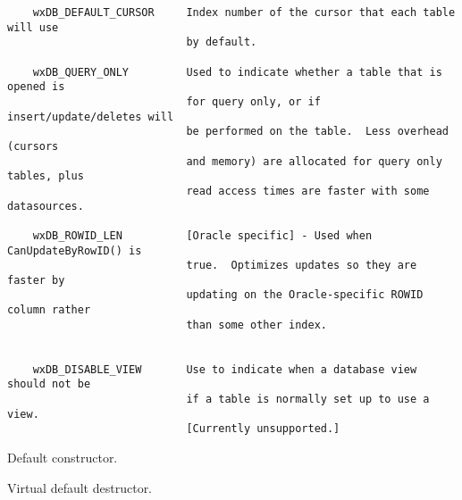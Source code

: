 \begin{verbatim}
    wxDB_DEFAULT_CURSOR     Index number of the cursor that each table will use
                            by default.

    wxDB_QUERY_ONLY         Used to indicate whether a table that is opened is
                            for query only, or if insert/update/deletes will
                            be performed on the table.  Less overhead (cursors
                            and memory) are allocated for query only tables, plus
                            read access times are faster with some datasources.

    wxDB_ROWID_LEN          [Oracle specific] - Used when CanUpdateByRowID() is
                            true.  Optimizes updates so they are faster by 
                            updating on the Oracle-specific ROWID column rather 
                            than some other index.


    wxDB_DISABLE_VIEW       Use to indicate when a database view should not be
                            if a table is normally set up to use a view.  
                            [Currently unsupported.]

\end{verbatim}





\label{wxdbtableconstr}


Default constructor.




\label{wxdbtabledestr}


Virtual default destructor.


\label{wxdbtablebuilddeletestmt}


